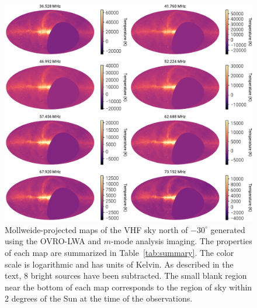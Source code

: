 \documentclass[twocolumn]{aastex61}
\begin{document}

\begin{figure}[t]
    \includegraphics[width=\textwidth]{figures/channel-maps/channel-maps}
    \caption{
        Mollweide-projected maps of the VHF sky north of $-30^\circ$ generated using the OVRO-LWA
        and $m$-mode analysis imaging. The properties of each map are summarized in
        Table~\ref{tab:summary}. The color scale is logarithmic and has units of Kelvin. As
        described in the text, 8 bright sources have been subtracted. The small blank region near
        the bottom of each map corresponds to the region of sky within 2 degrees of the Sun at the
        time of the observations.
    }
    \label{fig:channel-maps}
\end{figure}
\end{document}
